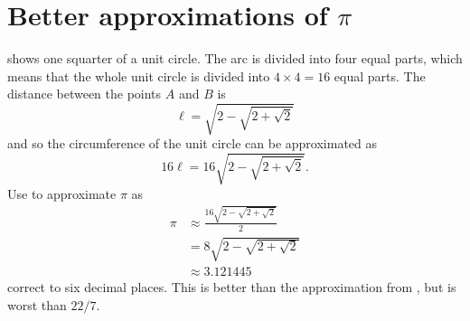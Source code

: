 \documentclass[a4paper,oneside,12pt]{article}
\begin{document}



\section{Better approximations of $\pi$}

 shows one
squarter of a unit circle.  The arc is divided into four equal parts,
which means that the whole unit circle is divided into
$4 \times 4 = 16$ equal parts.  The distance between the points $A$
and $B$ is
\[
\ell
=
\sqrt{
  2
  -
  \sqrt{2 + \sqrt{2}}
}
\]
and so the circumference of the unit circle can be approximated as
\[
16\ell
=
16
\sqrt{
  2
  -
  \sqrt{2 + \sqrt{2}}
}.
\]
Use  to approximate $\pi$
as
\begin{align*}
\pi
&\approx
\frac{
  16
  \sqrt{
    2
    -
    \sqrt{2 + \sqrt{2}}
  }
}{
  2
} \\[4pt]
&=
8
\sqrt{
  2
  -
  \sqrt{2 + \sqrt{2}}
} \\[4pt]
&\approx
3.121445
\end{align*}
correct to six decimal places.  This is better than the approximation
from , but is worst than
$22 / 7$.
\end{document}
